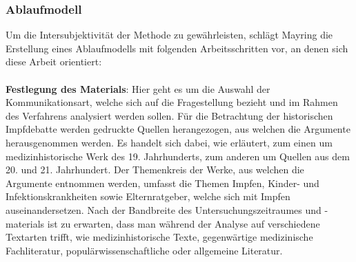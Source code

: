 \documentclass[
    a4paper,
    12pt,
    hyphens,
    chapterprefix=true,
    headheight=33pt,
    footheight=29pt,
    headings=optiontohead,
]{scrartcl}
\begin{document}
\subsubsection{Ablaufmodell}
Um die Intersubjektivität der Methode zu gewährleisten, schlägt Mayring die Erstellung eines Ablaufmodells mit folgenden Arbeitsschritten vor, an denen sich diese Arbeit orientiert:\\
\\
\textbf{Festlegung des Materials}: Hier geht es um die Auswahl der Kommunikationsart, welche sich auf die Fragestellung bezieht und im Rahmen des Verfahrens analysiert werden sollen. Für die Betrachtung der historischen Impfdebatte werden gedruckte Quellen herangezogen, aus welchen die Argumente herausgenommen werden. Es handelt sich dabei, wie erläutert, zum einen um medizinhistorische Werk des 19. Jahrhunderts, zum anderen um Quellen aus dem 20. und 21. Jahrhundert. Der Themenkreis der Werke, aus welchen die Argumente entnommen werden, umfasst die Themen Impfen, Kinder- und Infektionskrankheiten sowie Elternratgeber, welche sich mit Impfen auseinandersetzen. Nach der Bandbreite des Untersuchungszeitraumes und -materials ist zu erwarten, dass man während der Analyse auf verschiedene Textarten trifft, wie medizinhistorische Texte, gegenwärtige medizinische Fachliteratur, populärwissenschaftliche oder allgemeine Literatur.\\
\end{document}
